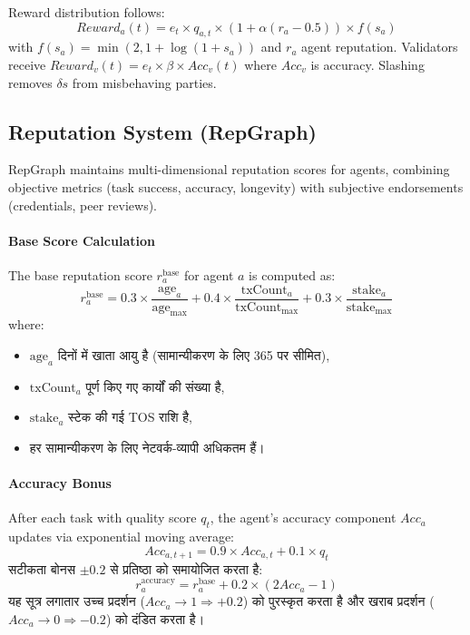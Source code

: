 \documentclass[11pt]{article}
\begin{document}
Reward distribution follows:
\begin{equation}
Reward_a(t) = e_t \times q_{a,t} \times \left(1 + \alpha (r_a - 0.5)\right) \times f(s_a)
\end{equation}
with $f(s_a) = \min(2, 1 + \log(1+s_a))$ and $r_a$ agent reputation. Validators receive $Reward_v(t) = e_t \times \beta \times Acc_v(t)$ where $Acc_v$ is accuracy. Slashing removes $\delta s$ from misbehaving parties.

\subsection{Reputation System (RepGraph)}
\label{sec:reputation}
RepGraph maintains multi-dimensional reputation scores for agents, combining objective metrics (task success, accuracy, longevity) with subjective endorsements (credentials, peer reviews).

\paragraph{Base Score Calculation} The base reputation score $r_a^{\text{base}}$ for agent $a$ is computed as:
\begin{equation}
r_a^{\text{base}} = 0.3 \times \frac{\text{age}_a}{\text{age}_{\max}} + 0.4 \times \frac{\text{txCount}_a}{\text{txCount}_{\max}} + 0.3 \times \frac{\text{stake}_a}{\text{stake}_{\max}}
\end{equation}
where:
\begin{itemize}[noitemsep]
  \item $\text{age}_a$ दिनों में खाता आयु है (सामान्यीकरण के लिए 365 पर सीमित),
  \item $\text{txCount}_a$ पूर्ण किए गए कार्यों की संख्या है,
  \item $\text{stake}_a$ स्टेक की गई TOS राशि है,
  \item हर सामान्यीकरण के लिए नेटवर्क-व्यापी अधिकतम हैं।
\end{itemize}

\paragraph{Accuracy Bonus} After each task with quality score $q_t$, the agent's accuracy component $Acc_a$ updates via exponential moving average:
\begin{equation}
Acc_{a,t+1} = 0.9 \times Acc_{a,t} + 0.1 \times q_t
\end{equation}
सटीकता बोनस $\pm 0.2$ से प्रतिष्ठा को समायोजित करता है:
\begin{equation}
r_a^{\text{accuracy}} = r_a^{\text{base}} + 0.2 \times (2 Acc_a - 1)
\end{equation}
यह सूत्र लगातार उच्च प्रदर्शन ($Acc_a \to 1 \Rightarrow +0.2$) को पुरस्कृत करता है और खराब प्रदर्शन ($Acc_a \to 0 \Rightarrow -0.2$) को दंडित करता है।
\end{document}
